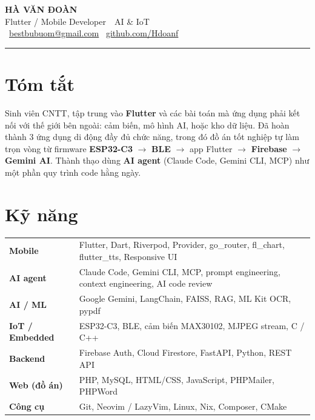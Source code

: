 \documentclass[11pt,a4paper]{article}
\newcommand{\icoMail}{\faEnvelope[regular]~}
\newcommand{\icoGit}{\faGithub~}
\newcommand{\icoPhone}{\faPhone*~}
\newcommand{\icoPin}{\faMapMarkerAlt~}
\newcommand{\icoMail}{}
\newcommand{\icoGit}{}
\newcommand{\icoPhone}{}
\newcommand{\icoPin}{}
\begin{document}
{\fontsize{26}{30}\selectfont\bfseries HÀ VĂN ĐOÀN}\\[4pt]
{\large\color{accent}Flutter / Mobile Developer\ \textcolor{muted}{\textbar}\ AI \& IoT}\\[7pt]
{\small
  \icoMail\href{mailto:bestbubuom@gmail.com}{bestbubuom@gmail.com}
  \quad\textcolor{rule}{\textbar}\quad
  \icoGit\href{https://github.com/Hdoanf}{github.com/Hdoanf}
}

\vspace{5pt}
{\color{rule}\rule{\linewidth}{0.6pt}}

\section{Tóm tắt}

Sinh viên CNTT, tập trung vào \textbf{Flutter} và các bài toán mà ứng dụng phải kết nối với
thế giới bên ngoài: cảm biến, mô hình AI, hoặc kho dữ liệu. Đã hoàn thành 3 ứng dụng di động
đầy đủ chức năng, trong đó đồ án tốt nghiệp tự làm trọn vòng từ firmware \textbf{ESP32-C3}
$\to$ \textbf{BLE} $\to$ app Flutter $\to$ \textbf{Firebase} $\to$ \textbf{Gemini AI}.
Thành thạo dùng \textbf{AI agent} (Claude Code, Gemini CLI, MCP) như một phần quy trình
code hằng ngày.

\section{Kỹ năng}

\begin{tabularx}{\linewidth}{@{}>{\raggedright\arraybackslash}p{3.2cm} X@{}}
  \textbf{Mobile}          & Flutter, Dart, Riverpod, Provider, go\_router, fl\_chart, flutter\_tts, Responsive UI \\[3pt]
  \textbf{AI agent}        & Claude Code, Gemini CLI, MCP, prompt engineering, context engineering, AI code review \\[3pt]
  \textbf{AI / ML}         & Google Gemini, LangChain, FAISS, RAG, ML Kit OCR, pypdf \\[3pt]
  \textbf{IoT / Embedded}  & ESP32-C3, BLE, cảm biến MAX30102, MJPEG stream, C / C++ \\[3pt]
  \textbf{Backend}         & Firebase Auth, Cloud Firestore, FastAPI, Python, REST API \\[3pt]
  \textbf{Web (đồ án)}     & PHP, MySQL, HTML/CSS, JavaScript, PHPMailer, PHPWord \\[3pt]
  \textbf{Công cụ}         & Git, Neovim / LazyVim, Linux, Nix, Composer, CMake \\
\end{tabularx}
\end{document}
